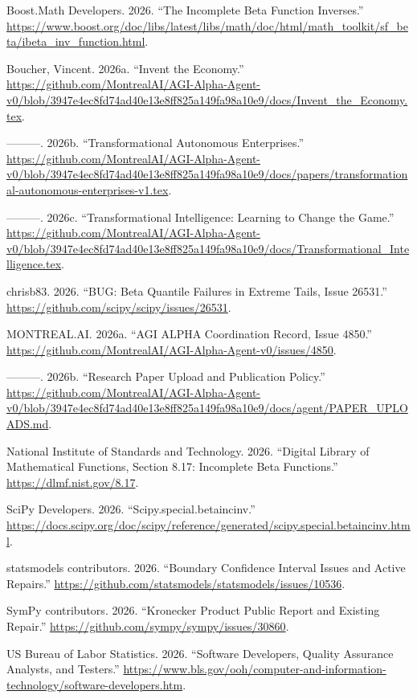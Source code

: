\documentclass[
  10pt,
]{article}
\newlength{\cslhangindent}
\newlength{\cslentryspacingunit} %
\newenvironment{CSLReferences}[2] %
 {%
  \setlength{\parindent}{0pt}
  \ifodd #1
  \let\oldpar\par
  \def\par{\hangindent=\cslhangindent\oldpar}
  \fi
  \setlength{\parskip}{#2\cslentryspacingunit}
 }%
 {}
\begin{document}
\hypertarget{refs}{}
\begin{CSLReferences}{1}{0}
\leavevmode{}%
Boost.Math Developers. 2026. {``The Incomplete Beta Function
Inverses.''}
\url{https://www.boost.org/doc/libs/latest/libs/math/doc/html/math_toolkit/sf_beta/ibeta_inv_function.html}.

\leavevmode{}%
Boucher, Vincent. 2026a. {``Invent the Economy.''}
\url{https://github.com/MontrealAI/AGI-Alpha-Agent-v0/blob/3947e4ec8fd74ad40e13e8ff825a149fa98a10e9/docs/Invent_the_Economy.tex}.

\leavevmode{}%
---------. 2026b. {``Transformational Autonomous Enterprises.''}
\url{https://github.com/MontrealAI/AGI-Alpha-Agent-v0/blob/3947e4ec8fd74ad40e13e8ff825a149fa98a10e9/docs/papers/transformational-autonomous-enterprises-v1.tex}.

\leavevmode{}%
---------. 2026c. {``Transformational Intelligence: Learning to Change
the Game.''}
\url{https://github.com/MontrealAI/AGI-Alpha-Agent-v0/blob/3947e4ec8fd74ad40e13e8ff825a149fa98a10e9/docs/Transformational_Intelligence.tex}.

\leavevmode{}%
chrisb83. 2026. {``{BUG}: Beta Quantile Failures in Extreme Tails, Issue
26531.''} \url{https://github.com/scipy/scipy/issues/26531}.

\leavevmode{}%
MONTREAL.AI. 2026a. {``AGI ALPHA Coordination Record, Issue 4850.''}
\url{https://github.com/MontrealAI/AGI-Alpha-Agent-v0/issues/4850}.

\leavevmode{}%
---------. 2026b. {``Research Paper Upload and Publication Policy.''}
\url{https://github.com/MontrealAI/AGI-Alpha-Agent-v0/blob/3947e4ec8fd74ad40e13e8ff825a149fa98a10e9/docs/agent/PAPER_UPLOADS.md}.

\leavevmode{}%
National Institute of Standards and Technology. 2026. {``Digital Library
of Mathematical Functions, Section 8.17: Incomplete Beta Functions.''}
\url{https://dlmf.nist.gov/8.17}.

\leavevmode{}%
SciPy Developers. 2026. {``Scipy.special.betaincinv.''}
\url{https://docs.scipy.org/doc/scipy/reference/generated/scipy.special.betaincinv.html}.

\leavevmode{}%
statsmodels contributors. 2026. {``Boundary Confidence Interval Issues
and Active Repairs.''}
\url{https://github.com/statsmodels/statsmodels/issues/10536}.

\leavevmode{}%
SymPy contributors. 2026. {``Kronecker Product Public Report and
Existing Repair.''} \url{https://github.com/sympy/sympy/issues/30860}.

\leavevmode{}%
US Bureau of Labor Statistics. 2026. {``Software Developers, Quality
Assurance Analysts, and Testers.''}
\url{https://www.bls.gov/ooh/computer-and-information-technology/software-developers.htm}.

\end{CSLReferences}
\end{document}
